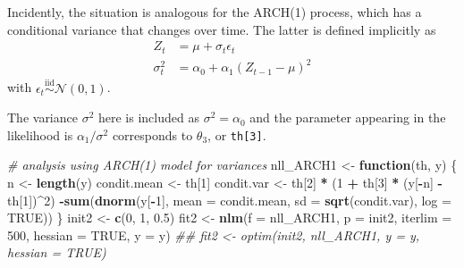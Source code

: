 \documentclass[]{book}
\newenvironment{Shaded}{\begin{snugshade}}{\end{snugshade}}
\newcommand{\CommentTok}[1]{\textcolor[rgb]{0.56,0.35,0.01}{\textit{#1}}}
\newcommand{\ControlFlowTok}[1]{\textcolor[rgb]{0.13,0.29,0.53}{\textbf{#1}}}
\newcommand{\DataTypeTok}[1]{\textcolor[rgb]{0.13,0.29,0.53}{#1}}
\newcommand{\DecValTok}[1]{\textcolor[rgb]{0.00,0.00,0.81}{#1}}
\newcommand{\FloatTok}[1]{\textcolor[rgb]{0.00,0.00,0.81}{#1}}
\newcommand{\KeywordTok}[1]{\textcolor[rgb]{0.13,0.29,0.53}{\textbf{#1}}}
\newcommand{\NormalTok}[1]{#1}
\newcommand{\OperatorTok}[1]{\textcolor[rgb]{0.81,0.36,0.00}{\textbf{#1}}}
\newcommand{\OtherTok}[1]{\textcolor[rgb]{0.56,0.35,0.01}{#1}}
\newcommand{\StringTok}[1]{\textcolor[rgb]{0.31,0.60,0.02}{#1}}
\begin{document}
Incidently, the situation is analogous for the ARCH(1) process, which
has a conditional variance that changes over time. The latter is defined
implicitly as \[
\begin{align*}
Z_t &= \mu + \sigma_t\epsilon_t\\
\sigma_t^2 &=\alpha_0+\alpha_1(Z_{t-1}-\mu)^2 
\end{align*}
\] with \(\epsilon_t \stackrel{\mathrm{iid}}{\sim} \mathcal{N}(0, 1)\).

The variance \(\sigma^2\) here is included as \(\sigma^2=\alpha_0\) and
the parameter appearing in the likelihood is \(\alpha_1/\sigma^2\)
corresponds to \(\theta_3\), or \texttt{th{[}3{]}}.

\begin{Shaded}
\begin{Highlighting}[]
\CommentTok{# analysis using ARCH(1) model for variances}
\NormalTok{nll_ARCH1 <-}\StringTok{ }\ControlFlowTok{function}\NormalTok{(th, y) \{}
\NormalTok{    n <-}\StringTok{ }\KeywordTok{length}\NormalTok{(y)}
\NormalTok{    condit.mean <-}\StringTok{ }\NormalTok{th[}\DecValTok{1}\NormalTok{]}
\NormalTok{    condit.var <-}\StringTok{ }\NormalTok{th[}\DecValTok{2}\NormalTok{] }\OperatorTok{*}\StringTok{ }\NormalTok{(}\DecValTok{1} \OperatorTok{+}\StringTok{ }\NormalTok{th[}\DecValTok{3}\NormalTok{] }\OperatorTok{*}\StringTok{ }\NormalTok{(y[}\OperatorTok{-}\NormalTok{n] }\OperatorTok{-}\StringTok{ }\NormalTok{th[}\DecValTok{1}\NormalTok{])}\OperatorTok{^}\DecValTok{2}\NormalTok{)}
    \OperatorTok{-}\KeywordTok{sum}\NormalTok{(}\KeywordTok{dnorm}\NormalTok{(y[}\OperatorTok{-}\DecValTok{1}\NormalTok{], }\DataTypeTok{mean =}\NormalTok{ condit.mean, }\DataTypeTok{sd =} \KeywordTok{sqrt}\NormalTok{(condit.var), }\DataTypeTok{log =} \OtherTok{TRUE}\NormalTok{))}
\NormalTok{\}}
\NormalTok{init2 <-}\StringTok{ }\KeywordTok{c}\NormalTok{(}\DecValTok{0}\NormalTok{, }\DecValTok{1}\NormalTok{, }\FloatTok{0.5}\NormalTok{)}
\NormalTok{fit2 <-}\StringTok{ }\KeywordTok{nlm}\NormalTok{(}\DataTypeTok{f =}\NormalTok{ nll_ARCH1, }\DataTypeTok{p =}\NormalTok{ init2, }\DataTypeTok{iterlim =} \DecValTok{500}\NormalTok{, }\DataTypeTok{hessian =} \OtherTok{TRUE}\NormalTok{, }\DataTypeTok{y =}\NormalTok{ y)}
\CommentTok{## fit2 <- optim(init2, nll_ARCH1, y = y, hessian = TRUE)}
\end{Highlighting}
\end{Shaded}
\end{document}
